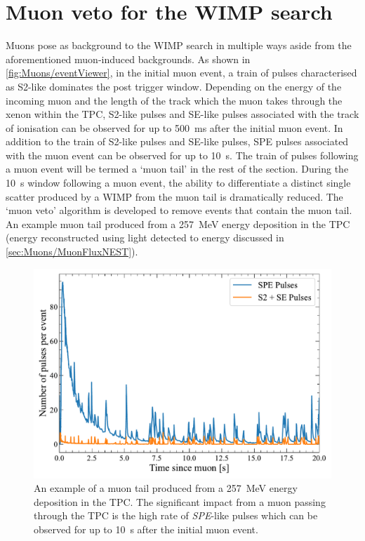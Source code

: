 \section{Muon veto for the WIMP search}\label{sec:Muons/MuonVeto}
Muons pose as background to the WIMP search in multiple ways aside from the aforementioned muon-induced backgrounds. As shown in \autoref{fig:Muons/eventViewer}, in the initial muon event, a train of pulses characterised as S2-like dominates the post trigger window. Depending on the energy of the incoming muon and the length of the track which the muon takes through the xenon within the TPC, S2-like pulses and SE-like pulses associated with the track of ionisation can be observed for up to 500~ms after the initial muon event. In addition to the train of S2-like pulses and SE-like pulses, SPE pulses associated with the muon event can be observed for up to 10~s. The train of pulses following a muon event will be termed a `muon tail' in the rest of the section. During the 10~s window following a muon event, the ability to differentiate a distinct single scatter produced by a WIMP from the muon tail is dramatically reduced. The `muon veto' algorithm is developed to remove events that contain the muon tail. An example muon tail produced from a 257~MeV energy deposition in the TPC (energy reconstructed using light detected to energy discussed in \autoref{sec:Muons/MuonFluxNEST}).

\begin{figure}[h!]
    \centering
    \includegraphics[width=0.7\linewidth]{figures/Muons/PulsesOverTime.pdf}
    \caption[An example of a muon tail produced from a 257~MeV energy deposition in the TPC.]{An example of a muon tail produced from a 257~MeV energy deposition in the TPC. The significant impact from a muon passing through the TPC is the high rate of \textit{SPE}-like pulses which can be observed for up to 10~s after the initial muon event.}
    \label{fig:MuonTailExample}
\end{figure}

